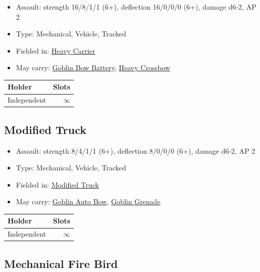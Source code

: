 \documentclass[a4paper,12pt]{article}
\begin{document}
\begin{itemize}
\item Assault: strength 16/8/1/1 (6+), deflection 16/0/0/0 (6+), damage d6-2, AP 2
\item Type: Mechanical, Vehicle, Tracked
\item Fielded in: \hyperref[unit-heavy-carrier]{Heavy Carrier}
\item May carry: \hyperref[equipment-goblin-bow-battery]{Goblin Bow Battery}, \hyperref[equipment-heavy-crossbow]{Heavy Crossbow}




\end{itemize}

\begin{tabular}{lr}
\textbf{Holder} & \textbf{Slots} \\
\hline
Independent & $\infty$ \\
\end{tabular}
\vspace{1ex}
\subsection{Modified Truck}
\label{model-modified-truck}

\begin{itemize}
\item Assault: strength 8/4/1/1 (6+), deflection 8/0/0/0 (6+), damage d6-2, AP 2
\item Type: Mechanical, Vehicle, Tracked
\item Fielded in: \hyperref[unit-modified-truck]{Modified Truck}
\item May carry: \hyperref[equipment-goblin-auto-bow]{Goblin Auto Bow}, \hyperref[equipment-goblin-grenade-free]{Goblin Grenade}




\end{itemize}

\begin{tabular}{lr}
\textbf{Holder} & \textbf{Slots} \\
\hline
Independent & $\infty$ \\
\end{tabular}
\vspace{1ex}
\subsection{Mechanical Fire Bird}
\label{model-mechanical-fire-bird}
\end{document}
